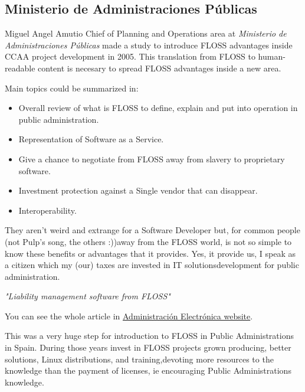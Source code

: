 \subsection{Ministerio de Administraciones P\'ublicas}

\par Miguel Angel Amutio Chief of Planning and Operations area at \textit{Ministerio de Administraciones P\'ublicas} made a study to introduce FLOSS advantages inside CCAA project development in 2005. This translation from FLOSS to human-readable content is necesary to spread FLOSS advantages inside a new area.

\par Main topics could be summarized in:

\begin{itemize}
	\item Overall review of what is FLOSS to define, explain and put into operation in public administration.
	\item Representation of Software as a Service.
	\item Give a chance to negotiate from FLOSS away from slavery to proprietary software.
	\item Investment protection against a Single vendor that can disappear.
	\item Interoperability.
\end{itemize} They aren't weird and extrange for a Software Developer but, for common people (not Pulp's song, the others :))away from the FLOSS world, is not so simple to know these benefits or advantages that it provides. Yes, it provide us, I speak as a citizen which my (our) taxes are invested in IT solutionsdevelopment for public administration.

\par \textit{"Liability management software from FLOSS"}

\par You can see the whole article in \href{http://administracionelectronica.gob.es/?_nfpb=true&amp;_pageLabel=P803324061272301226576&amp;langPae=es&amp;detalleLista=PAE_000001307}{Administraci\'on Electr\'onica website}.

\par This was a very huge step for introduction to FLOSS in Public Administrations in Spain. During those years invest in FLOSS projects grown producing, better solutions, Linux distributions, and training,devoting more resources to the knowledge than the payment of licenses, ie encouraging Public Administrations knowledge.


